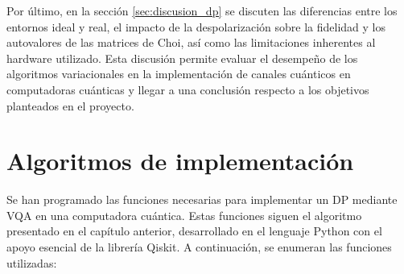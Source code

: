 \documentclass[letterpaper,12pt]{thesisECFM}
\theoremstyle{plain}
\theoremstyle{definition}
\theoremstyle{definition}
\theoremstyle{remark}
\newcommand{\1}{\mathbb{1}}
\begin{document}
Por último, en la sección \ref{sec:discusion_dp} se discuten las diferencias entre los entornos ideal y real, el impacto de la despolarización sobre la fidelidad y los autovalores de las matrices de Choi, así como las limitaciones inherentes al hardware utilizado. Esta discusión permite evaluar el desempeño de los algoritmos variacionales en la implementación de canales cuánticos en computadoras cuánticas y llegar a una conclusión respecto a los objetivos planteados en el proyecto. 
\section{Algoritmos de implementación} %
\label{sec:algoritmos_vqa}
Se han programado las funciones necesarias para implementar un DP mediante VQA
en una computadora cuántica. Estas funciones siguen el algoritmo presentado en
el capítulo anterior, desarrollado en el lenguaje Python con el apoyo esencial
de la librería Qiskit. A continuación, se enumeran las funciones utilizadas: 
\end{document}
